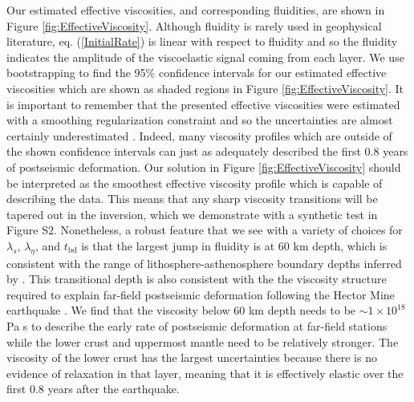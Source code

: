 \documentclass[draft,linenumbers]{AGUJournal}
\begin{document}
Our estimated effective viscosities, and corresponding fluidities, are shown in Figure \ref{fig:EffectiveViscosity}.  Although fluidity is rarely used in geophysical literature, eq. (\ref{InitialRate}) is linear with respect to fluidity and so the fluidity indicates the amplitude of the viscoelastic signal coming from each layer.  We use bootstrapping to find the 95\% confidence intervals for our estimated effective viscosities which are shown as shaded regions in Figure \ref{fig:EffectiveViscosity}.  It is important to remember that the presented effective viscosities were estimated with a smoothing regularization constraint and so the uncertainties are almost certainly underestimated \citep{Aster2011}.  Indeed, many viscosity profiles which are outside of the shown confidence intervals can just as adequately described the first 0.8 years of postseismic deformation. Our solution in Figure \ref{fig:EffectiveViscosity} should be interpreted as the smoothest effective viscosity profile which is capable of describing the data.  This means that any  sharp viscosity transitions will be tapered out in the inversion, which we demonstrate with a synthetic test in Figure S2.  Nonetheless, a robust feature that we see with a variety of choices for $\lambda_s$, $\lambda_\eta$, and $t_\mathrm{bd}$ is that the largest jump in fluidity is at 60 km depth, which is consistent with the range of lithosphere-asthenosphere boundary depths inferred by \citet{Lekic2011}. This transitional depth is also consistent with the the viscosity structure required to explain far-field postseismic deformation following the Hector Mine earthquake \citep{Freed2007a}. We find that the viscosity below 60 km depth needs to be ${\sim}1\times10^{18}$ Pa s to describe the early rate of postseismic deformation at far-field stations while the lower crust and uppermost mantle need to be relatively stronger.  The viscosity of the lower crust has the largest uncertainties because there is no evidence of relaxation in that layer, meaning that it is effectively elastic over the first 0.8 years after the earthquake.  
\end{document}
